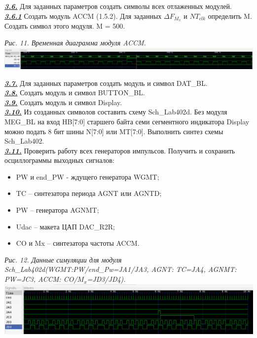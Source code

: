 \documentclass[a4paper]{article}
\begin{document}
\textbf{\textit{\underline{3.6.}}} Для заданных параметров создать символы всех отлаженных модулей. \\

\textbf{\textit{\underline{3.6.1}}} Создать модуль ACCM (1.5.2). Для заданных $\Delta F_{M_{x}}$ и $NT_{clk}$ определить M. Создать символ этого модуля. M = 500.
\begin{center}
	\textit{Рис. 11. Временная диаграмма модуля ACCM.}
	\includegraphics[scale=0.3]{../images/ACCM.png}
\end{center}

\textbf{\textit{\underline{3.7.}}} Для заданных параметров создать модуль и символ DAT\_BL. \\

\textbf{\textit{\underline{3.8.}}} Создать модуль и символ BUTTON\_BL. \\

\textbf{\textit{\underline{3.9.}}} Создать модуль и символ Display. \\

\textbf{\textit{\underline{3.10.}}} Из созданных символов составить схему Sch\_Lab402d. Без модуля MEG\_BL на вход HB[7:0] старшего байта семи сегментного индикатора Display можно подать 8 бит шины N[7:0] или MT[7:0]. Выполнить синтез схемы Sch\_Lab402. \\

\textbf{\textit{\underline{3.11.}}} Проверить работу всех генераторов импульсов. Получить и сохранить осциллограммы выходных сигналов:
\begin{itemize}
	\item PW и end\_PW - ждущего генератора WGMT;
	\item TC – синтезатора периода AGNT или AGNTD;
	\item PW – генератора AGNMT;
	\item Udac – макета ЦАП DAC\_R2R;
	\item CO и Mx – синтезатора частоты ACCM.
\end{itemize}
\begin{center}
	\textit{Рис. 12. Данные симуляции для модуля Sch\_Lab402d(WGMT:PW/end\_Pw=JA1/JA3, AGNT: TC=JA4, AGNMT: PW=JC3, ACCM: CO/$M_{x}$=JD3/JD4).}
	\includegraphics[scale=0.5]{../images/Sch_Lab402d_data.png}
\end{center}
\end{document}
